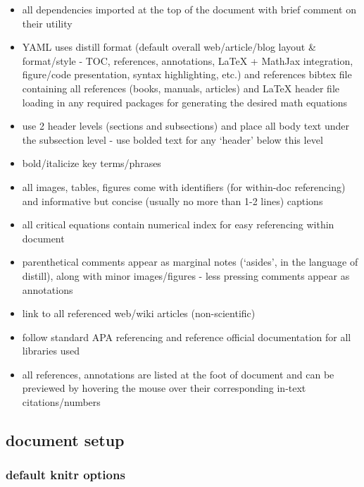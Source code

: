 \documentclass[
]{article}
\providecommand{\tightlist}{%
  \setlength{\itemsep}{0pt}\setlength{\parskip}{0pt}}
\begin{document}
\begin{itemize}
\tightlist
\item
  all dependencies imported at the top of the document with brief
  comment on their utility
\item
  YAML uses distill format (default overall web/article/blog layout \&
  format/style - TOC, references, annotations, LaTeX + MathJax
  integration, figure/code presentation, syntax highlighting, etc.) and
  references bibtex file containing all references (books, manuals,
  articles) and LaTeX header file loading in any required packages for
  generating the desired math equations
\item
  use 2 header levels (sections and subsections) and place all body text
  under the subsection level - use bolded text for any `header' below
  this level
\item
  bold/italicize key terms/phrases
\item
  all images, tables, figures come with identifiers (for within-doc
  referencing) and informative but concise (usually no more than 1-2
  lines) captions
\item
  all critical equations contain numerical index for easy referencing
  within document
\item
  parenthetical comments appear as marginal notes (`asides', in the
  language of distill), along with minor images/figures - less pressing
  comments appear as annotations
\item
  link to all referenced web/wiki articles (non-scientific)
\item
  follow standard APA referencing and reference official documentation
  for all libraries used
\item
  all references, annotations are listed at the foot of document and can
  be previewed by hovering the mouse over their corresponding in-text
  citations/numbers
\end{itemize}

\hypertarget{document-setup}{%
\subsection{document setup}\label{document-setup}}

\hypertarget{default-knitr-options}{%
\subsubsection{default knitr options}\label{default-knitr-options}}
\end{document}
